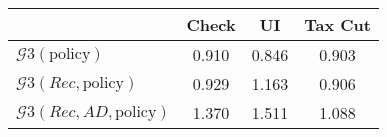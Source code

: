 \begin{tabular}{@{}lccc@{}}
\toprule
                          & Check      & UI    & Tax Cut    \\  \midrule
$\mathcal{G}3(\text{policy})$ & 0.910  & 0.846  & 0.903     \\
$\mathcal{G}3(Rec,\text{policy})$ & 0.929  & 1.163  & 0.906     \\
$\mathcal{G}3(Rec, AD,\text{policy})$ & 1.370  & 1.511  & 1.088     \\
\end{tabular}
